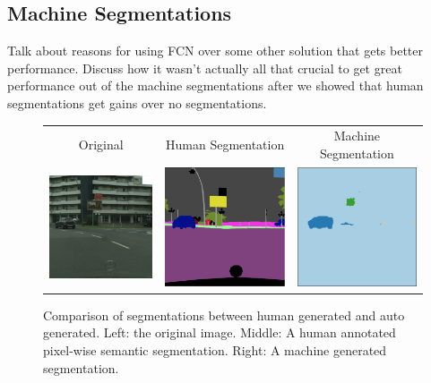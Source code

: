 \documentclass[10pt,twocolumn,letterpaper]{article}
\begin{document}
\subsection{Machine Segmentations}
Talk about reasons for using FCN \cite{FullyConvolutionalSS} over some other
solution that gets better performance. Discuss how it wasn't actually all that
crucial to get great performance out of the machine segmentations after we
showed that human segmentations get gains over no segmentations.

\begin{figure}[ht!]
\begin{center}
    \begin{tabular}{ccc}
        Original & Human Segmentation & Machine Segmentation \\
    \includegraphics[trim=0 0 0 0, clip,
        width=2.0in]{images/segmentation_original.png} &
    \includegraphics[trim=0 0 0 0, clip,
        width=2.0in]{images/segmentation_human.png} &
    \includegraphics[trim=0 0 0 0, clip,
        width=2.0in]{images/segmentation_machine.png} \\
    \end{tabular}
\end{center}
                \caption{Comparison of segmentations between human generated
                and auto generated. Left: the original image. Middle: A human
                annotated pixel-wise semantic segmentation. Right: A machine
                generated segmentation.}
	\label{fig:segmentations}
\end{figure}
\end{document}
